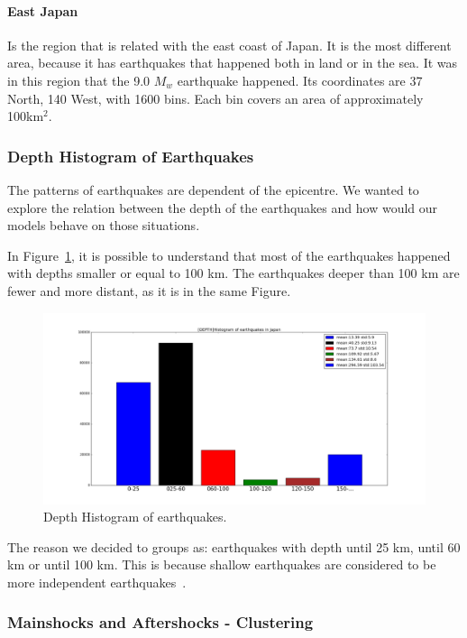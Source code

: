 \paragraph{East Japan} Is the region that is related with the east coast of Japan. It is the most different area, because it has earthquakes that happened both in land or in the sea. It was in this region that the 9.0 $M_w$ earthquake happened. Its coordinates are 37 North, 140 West, with 1600 bins. Each bin covers an area of approximately 100km$^2$. 

\subsubsection{Depth Histogram of Earthquakes}


The patterns of earthquakes are dependent of the epicentre. We wanted to explore the relation between the depth of the earthquakes and how would our models behave on those situations.

In Figure~\ref{histogramQuakes}, it is possible to understand that most of the earthquakes happened with depths smaller or equal to 100 km. The earthquakes deeper than 100 km are fewer and more distant, as it is in the same Figure.\\

\begin{figure}[]
	\centering
	\includegraphics[scale=0.15]{img/detphsNew.png}
	\caption{Depth Histogram of earthquakes.}
	\label{histogramQuakes}
\end{figure}

The reason we decided to groups as: earthquakes with depth until 25 km, until 60 km or until 100 km. This is because shallow earthquakes are considered to be more independent earthquakes~\cite{yamanaka1990scaling}.

\subsubsection{Mainshocks and Aftershocks - Clustering}\label{Clustering}

